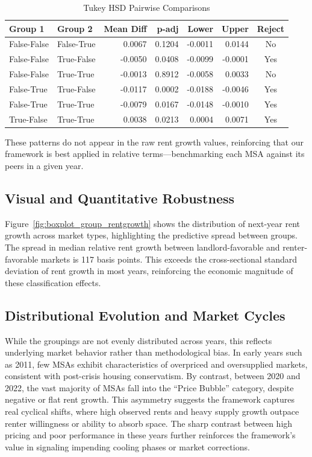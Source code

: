 \documentclass[APA,Times1COL]{WileyNJDv5} %
\begin{document}
\begin{table}[h!]
	\centering
	\caption*{Tukey HSD Pairwise Comparisons}
	\label{tab:tukey_results}
	\begin{tabular}{llrrrrc}
		\toprule
		\textbf{Group 1} & \textbf{Group 2} & \textbf{Mean Diff} & \textbf{p-adj} & \textbf{Lower} & \textbf{Upper} & \textbf{Reject} \\
		\midrule
		False-False & False-True  &  0.0067 & 0.1204 & -0.0011 &  0.0144 & No \\
		False-False & True-False  & -0.0050 & 0.0408 & -0.0099 & -0.0001 & Yes \\
		False-False & True-True   & -0.0013 & 0.8912 & -0.0058 &  0.0033 & No \\
		False-True  & True-False  & -0.0117 & 0.0002 & -0.0188 & -0.0046 & Yes \\
		False-True  & True-True   & -0.0079 & 0.0167 & -0.0148 & -0.0010 & Yes \\
		True-False  & True-True   &  0.0038 & 0.0213 &  0.0004 &  0.0071 & Yes \\
		\bottomrule
	\end{tabular}
\end{table}

These patterns do not appear in the raw rent growth values, reinforcing that our framework is best applied in relative terms—benchmarking each MSA against its peers in a given year.

\subsection{Visual and Quantitative Robustness}

Figure~\ref{fig:boxplot_group_rentgrowth} shows the distribution of next-year rent growth across market types, highlighting the predictive spread between groups.
The spread in median relative rent growth between landlord-favorable and renter-favorable markets is 117 basis points. This exceeds the cross-sectional standard deviation of rent growth in most years, reinforcing the economic magnitude of these classification effects.

\subsection{Distributional Evolution and Market Cycles}

While the groupings are not evenly distributed across years, this reflects underlying market behavior rather than methodological bias. In early years such as 2011, few MSAs exhibit characteristics of overpriced and oversupplied markets, consistent with post-crisis housing conservatism. By contrast, between 2020 and 2022, the vast majority of MSAs fall into the “Price Bubble” category, despite negative or flat rent growth. This asymmetry suggests the framework captures real cyclical shifts, where high observed rents and heavy supply growth outpace renter willingness or ability to absorb space. The sharp contrast between high pricing and poor performance in these years further reinforces the framework’s value in signaling impending cooling phases or market corrections.
\end{document}
